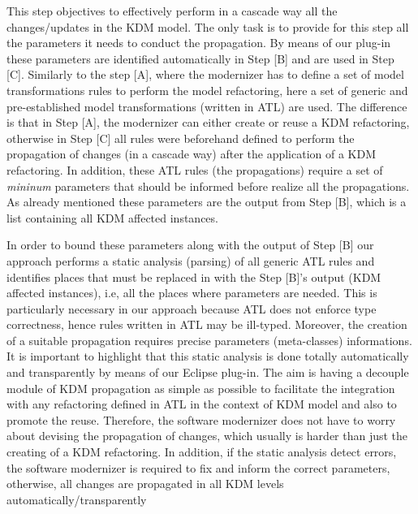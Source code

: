 This step objectives to effectively perform in a cascade way all the changes/updates in the KDM model. 
%
The only task is to provide for this step all the parameters it needs to conduct the propagation. By means of our plug-in these parameters are identified automatically in Step [B] and are used in Step [C]. 
%
%
Similarly to the step [A], where the modernizer has to define a set of model transformations rules to perform the model refactoring, here a set of generic and pre-established model transformations (written in ATL) are used. The difference is that in Step [A], the modernizer can either create or reuse a KDM refactoring, otherwise in Step [C] all rules were beforehand defined to perform the propagation of changes (in a cascade way) after the application of a KDM refactoring. In addition, these ATL rules (the propagations) require a set of  \textit{mininum} parameters that should be informed before realize all the propagations. As already mentioned these parameters are the output from Step [B], which is a list containing all KDM affected instances. 

In order to bound these parameters along with the output of Step [B] our approach performs a static analysis (parsing) of all generic ATL rules and identifies places that must be replaced in with the Step [B]'s output (KDM affected instances), i.e, all the places where parameters are needed. This is particularly necessary in our approach because ATL does not enforce type correctness, hence rules written in ATL may be ill-typed. Moreover, the creation of a suitable propagation %
requires precise parameters (meta-classes) informations. It is important to highlight that this static analysis is done totally automatically and transparently by means of our Eclipse plug-in. The aim is having a decouple module of KDM propagation as simple as possible to facilitate the integration with any refactoring defined in ATL in the context of KDM model and also to promote the reuse. Therefore, the software modernizer does not have to worry about devising the propagation of changes, which usually is harder than just the creating of a KDM refactoring. 
%
In addition, if the static analysis detect errors, the software modernizer is required to fix and inform the correct parameters, otherwise, all changes are propagated in all KDM levels automatically/transparently  



